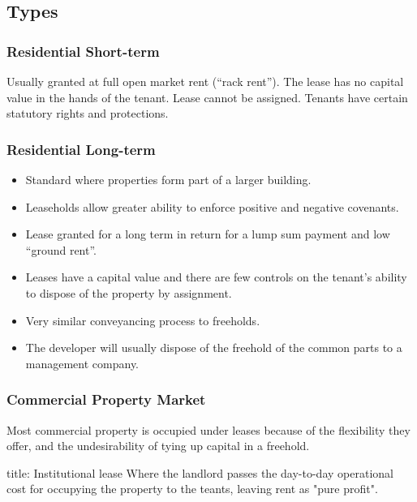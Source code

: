 \documentclass[
]{article}
\newenvironment{Shaded}{}{}
\newcommand{\NormalTok}[1]{#1}
\providecommand{\tightlist}{%
  \setlength{\itemsep}{0pt}\setlength{\parskip}{0pt}}
\begin{document}
\hypertarget{types}{%
\subsection{Types}\label{types}}

\hypertarget{residential-short-term}{%
\subsubsection{Residential Short-term}\label{residential-short-term}}

Usually granted at full open market rent (``rack rent''). The lease has
no capital value in the hands of the tenant. Lease cannot be assigned.
Tenants have certain statutory rights and protections.

\hypertarget{residential-long-term}{%
\subsubsection{Residential Long-term}\label{residential-long-term}}

\begin{itemize}
\tightlist
\item
  Standard where properties form part of a larger building.
\item
  Leaseholds allow greater ability to enforce positive and negative
  covenants.
\item
  Lease granted for a long term in return for a lump sum payment and low
  ``ground rent''.
\item
  Leases have a capital value and there are few controls on the tenant's
  ability to dispose of the property by assignment.
\item
  Very similar conveyancing process to freeholds.
\item
  The developer will usually dispose of the freehold of the common parts
  to a management company.
\end{itemize}

\hypertarget{commercial-property-market}{%
\subsubsection{Commercial Property
Market}\label{commercial-property-market}}

Most commercial property is occupied under leases because of the
flexibility they offer, and the undesirability of tying up capital in a
freehold.

\begin{Shaded}
\begin{Highlighting}[]
\NormalTok{title: Institutional lease}
\NormalTok{Where the landlord passes the day{-}to{-}day operational cost for occupying the property to the teants, leaving rent as "pure profit". }
\end{Highlighting}
\end{Shaded}
\end{document}
